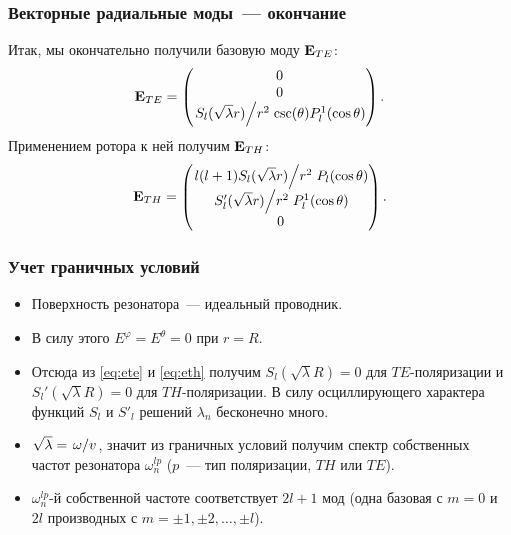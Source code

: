 \documentclass[compress]{beamer}
\begin{document}
    \begin{frame}\frametitle{Векторные радиальные моды~--- окончание}

        Итак, мы окончательно получили базовую моду $\vb{E}_{TE}$:
        \begin{equation}\label{eq:ete}
            \vb{E}_{TE} = \begin{pmatrix}
                0 \\ 0 \\ \flatfrac{S_l(\sqrt\lambda r)}{r^2} \csc(\theta) P^1_l(\cos\theta)
            \end{pmatrix} .
        \end{equation}
        Применением ротора к ней получим $\vb{E}_{TH}$:
        \begin{equation}\label{eq:eth}
            \vb{E}_{TH} = \begin{pmatrix}
                \flatfrac{l(l+1) S_l(\sqrt\lambda r)}{r^2} P_l(\cos\theta) \\
                \flatfrac{S_l'(\sqrt\lambda r)}{r^2} P_l^1(\cos\theta) \\
                0
            \end{pmatrix} .
        \end{equation}

    \end{frame}


    \begin{frame}\frametitle{Учет граничных условий}

        \begin{itemize}\justifying
            \item Поверхность резонатора~--- идеальный проводник.

            \item В силу этого $E^\varphi = E^\theta = 0$ при $r = R$.

            \item Отсюда из \autoref{eq:ete} и \autoref{eq:eth} получим $S_l(\sqrt\lambda R) = 0$ для $TE$-поляризации и $S_l'(\sqrt\lambda R) = 0$ для $TH$-поляризации. В силу осциллирующего характера функций $S_l$ и $S'_l$ решений $\lambda_n$ бесконечно много.

            \item $\sqrt\lambda = \flatfrac{\omega}{v}$, значит из граничных условий получим спектр собственных частот резонатора $\omega^{lp}_n$ ($p$~--- тип поляризации, $TH$ или $TE$).

            \item $\omega^{lp}_n$-й собственной частоте соответствует $2l + 1$ мод (одна базовая с $m = 0$ и $2l$ производных с $m = \pm 1, \pm 2, \dots, \pm l$).
        \end{itemize}

    \end{frame}
\end{document}
